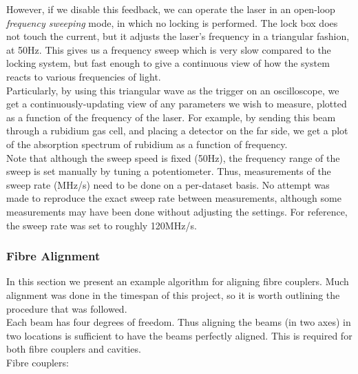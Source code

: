 However, if we disable this feedback, we can operate the laser in an open-loop \emph{frequency sweeping} mode, in which no locking is performed.  The lock box does not touch the current, but it adjusts the laser's frequency in a triangular fashion, at 50Hz.  This gives us a frequency sweep which is very slow compared to the locking system, but fast enough to give a continuous view of how the system reacts to various frequencies of light. \\

Particularly, by using this triangular wave as the trigger on an oscilloscope, we get a continuously-updating view of any parameters we wish to measure, plotted as a function of the frequency of the laser.  For example, by sending this beam through a rubidium gas cell, and placing a detector on the far side, we get a plot of the absorption spectrum of rubidium as a function of frequency. \\

Note that although the sweep speed is fixed (50Hz), the frequency range of the sweep is set manually by tuning a potentiometer.  Thus, measurements of the sweep rate (MHz/s) need to be done on a per-dataset basis.  No attempt was made to reproduce the exact sweep rate between measurements, although some measurements may have been done without adjusting the settings.  For reference, the sweep rate was set to roughly 120MHz/s. \\

    \subsubsection{Fibre Alignment}

In this section we present an example algorithm for aligning fibre couplers.  Much alignment was done in the timespan of this project, so it is worth outlining the procedure that was followed. \\

Each beam has four degrees of freedom.  Thus aligning the beams (in two axes) in two locations is sufficient to have the beams perfectly aligned.  This is required for both fibre couplers and cavities. \\

Fibre couplers:

